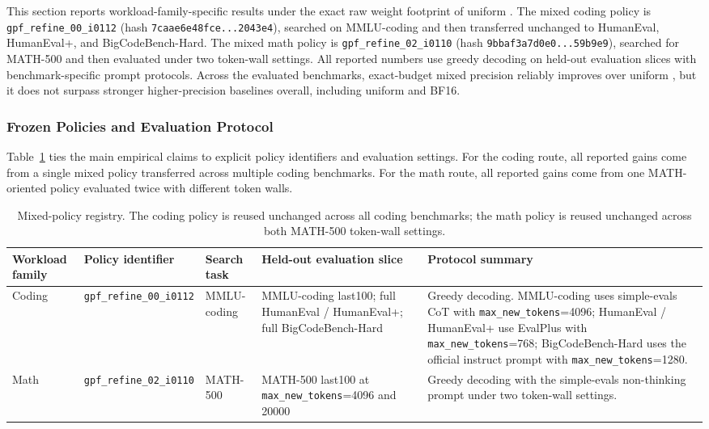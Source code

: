 This section reports workload-family-specific results under the exact raw weight footprint of uniform \intfour{}. The mixed coding policy is \texttt{gpf\_refine\_00\_i0112} (hash \texttt{7caae6e48fce...2043e4}), searched on MMLU-coding and then transferred unchanged to HumanEval, HumanEval+, and BigCodeBench-Hard. The mixed math policy is \texttt{gpf\_refine\_02\_i0110} (hash \texttt{9bbaf3a7d0e0...59b9e9}), searched for MATH-500 and then evaluated under two token-wall settings. All reported numbers use greedy decoding on held-out evaluation slices with benchmark-specific prompt protocols. Across the evaluated benchmarks, exact-budget mixed precision reliably improves over uniform \intfour{}, but it does not surpass stronger higher-precision baselines overall, including uniform \inteight{} and BF16.

\subsubsection{Frozen Policies and Evaluation Protocol}

Table~\ref{tab:results-artifact-registry} ties the main empirical claims to explicit policy identifiers and evaluation settings. For the coding route, all reported gains come from a single mixed policy transferred across multiple coding benchmarks. For the math route, all reported gains come from one MATH-oriented policy evaluated twice with different token walls.

\begin{table}[t]
\centering
\caption{Mixed-policy registry. The coding policy is reused unchanged across all coding benchmarks; the math policy is reused unchanged across both MATH-500 token-wall settings.}
\label{tab:results-artifact-registry}
\footnotesize
\begin{tabular}{p{}p{}p{}p{}p{}}
\toprule
Workload family & Policy identifier & Search task & Held-out evaluation slice & Protocol summary \\
\midrule
Coding & \texttt{gpf\_refine\_00\_i0112} & MMLU-coding & MMLU-coding last100; full HumanEval / HumanEval+; full BigCodeBench-Hard & Greedy decoding. MMLU-coding uses simple-evals CoT with \texttt{max\_new\_tokens}=4096; HumanEval / HumanEval+ use EvalPlus with \texttt{max\_new\_tokens}=768; BigCodeBench-Hard uses the official instruct prompt with \texttt{max\_new\_tokens}=1280. \\
\midrule
Math & \texttt{gpf\_refine\_02\_i0110} & MATH-500 & MATH-500 last100 at \texttt{max\_new\_tokens}=4096 and 20000 & Greedy decoding with the simple-evals non-thinking prompt under two token-wall settings. \\
\bottomrule
\end{tabular}
\end{table}

